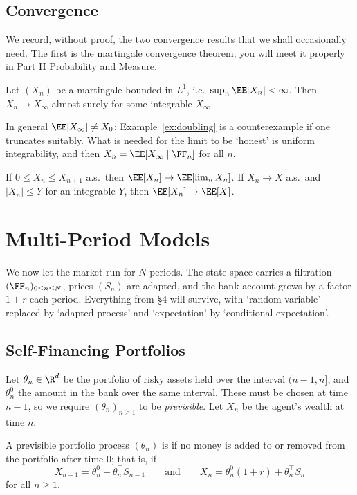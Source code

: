 \subsection{Convergence}

We record, without proof, the two convergence results that we shall occasionally need. The first is the martingale convergence theorem; you will meet it properly in Part II Probability and Measure.

\begin{theorem}
	Let $(X_n)$ be a martingale bounded in $L^1$, i.e.\ $\sup_n\EE|X_n| < \infty$. Then $X_n \to X_\infty$ almost surely for some integrable $X_\infty$.
\end{theorem}

In general $\EE[X_\infty] \neq X_0$: Example~\ref{ex:doubling} is a counterexample if one truncates suitably. What is needed for the limit to be `honest' is uniform integrability, and then $X_n = \EE[X_\infty\mid\FF_n]$ for all $n$.

\begin{theorem}
	If $0\leq X_n \leq X_{n+1}$ a.s.\ then $\EE[X_n]\to\EE[\lim_n X_n]$. If $X_n \to X$ a.s.\ and $|X_n|\leq Y$ for an integrable $Y$, then $\EE[X_n]\to\EE[X]$.
\end{theorem}

\section{Multi-Period Models}

We now let the market run for $N$ periods. The state space carries a filtration $(\FF_n)_{0\leq n\leq N}$, prices $(S_n)$ are adapted, and the bank account grows by a factor $1+r$ each period. Everything from \S4 will survive, with `random variable' replaced by `adapted process' and `expectation' by `conditional expectation'.

\subsection{Self-Financing Portfolios}

Let $\theta_n \in \R^d$ be the portfolio of risky assets held over the interval $(n-1,n]$, and $\theta_n^0$ the amount in the bank over the same interval. These must be chosen at time $n-1$, so we require $(\theta_n)_{n\geq1}$ to be \emph{previsible}. Let $X_n$ be the agent's wealth at time $n$.

\begin{definition}
	A previsible portfolio process $(\theta_n)$ is  if no money is added to or removed from the portfolio after time $0$; that is, if
	$$
	X_{n-1} = \theta_n^0 + \theta_n^\top S_{n-1} \qquad \text{and}\qquad X_n = \theta_n^0(1+r) + \theta_n^\top S_n
	$$
	for all $n \geq 1$.
\end{definition}

